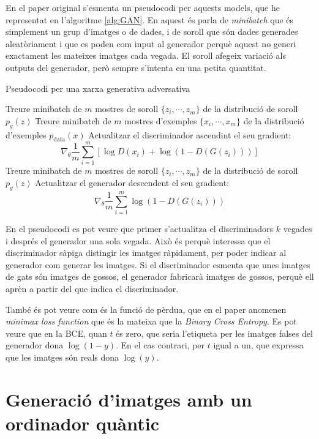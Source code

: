 En el paper original \cite{GAN2014} s'esmenta un pseudocodi per aquests models, que he representat en l'algoritme \ref{alg:GAN}. En aquest és parla de \textit{minibatch} que és simplement un grup d'imatges o de dades, i de soroll que són dades generades aleatòriament i que es poden com input al generador perquè aquest no generi exactament les mateixes imatges cada vegada. El soroll afegeix variació als outputs del generador, però sempre s'intenta en una petita quantitat. 

\begin{algorithm}
	\caption{Pseudocodi per una xarxa generativa adversativa}\label{alg:GAN}
	\begin{algorithmic}
		\State Treure minibatch de $m$ mostres de soroll $\{z_i, \cdots, z_m\}$ de la distribució de soroll $p_g(z)$
		\State Treure minibatch de $m$ mostres d'exemples $\{x_i, \cdots, x_m\}$ de la distribució d'exemples $p_{\mathrm{data}}(x)$
		\State Actualitzar el discriminador ascendint el seu gradient: 
		$$
		\nabla_\theta \frac{1}{m}\sum_{i=1}^{m}\left[\log D(x_i) + \log(1- D(G(z_i)))\right]
		$$
		\EndFor
		\State Treure minibatch de $m$ mostres de soroll $\{z_i, \cdots, z_m\}$ de la distribució de soroll $p_g(z)$
		\State Actualitzar el generador descendent el seu gradient:
		$$
		\nabla_\theta \frac{1}{m} \sum_{i=1}^{m} \log(1-D(G(z_i)))
		$$
		\EndFor
	\end{algorithmic}
\end{algorithm}

En el pseudocodi es pot veure que primer s'actualitza el discriminadors $k$ vegades i després  el generador una sola vegada. Això és perquè interessa que el discriminador sàpiga distingir les imatges ràpidament, per poder indicar al generador com generar les imatges. Si el discriminador esmenta que unes imatges de gats són imatges de gossos, el generador fabricarà imatges de gossos, perquè ell aprèn a partir del que indica el discriminador.

També és pot veure com és la funció de pèrdua, que en el paper anomenen \textit{minimax loss function} que és la mateixa que la \textit{Binary Cross Entropy}. Es pot veure que en la BCE, quan $t$ és zero, que seria l'etiqueta per les imatges falses del generador dona $\log(1-y)$. En el cas contrari, per $t$ igual a un, que expressa que les imatges són reals dona $\log(y)$.  


\chapter{Generació d'imatges amb un ordinador quàntic}
